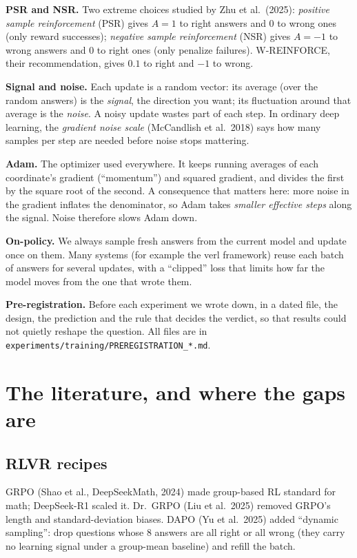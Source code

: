 \documentclass[11pt]{article}
\begin{document}
\textbf{PSR and NSR.} Two extreme choices studied by Zhu et al.\ (2025): \emph{positive sample reinforcement} (PSR) gives $A=1$ to right answers and $0$ to wrong ones (only reward successes); \emph{negative sample reinforcement} (NSR) gives $A=-1$ to wrong answers and $0$ to right ones (only penalize failures). W-REINFORCE, their recommendation, gives $0.1$ to right and $-1$ to wrong.

\textbf{Signal and noise.} Each update is a random vector: its average (over the random answers) is the \emph{signal}, the direction you want; its fluctuation around that average is the \emph{noise}. A noisy update wastes part of each step. In ordinary deep learning, the \emph{gradient noise scale} (McCandlish et al.\ 2018) says how many samples per step are needed before noise stops mattering.

\textbf{Adam.} The optimizer used everywhere. It keeps running averages of each coordinate's gradient (``momentum'') and squared gradient, and divides the first by the square root of the second. A consequence that matters here: more noise in the gradient inflates the denominator, so Adam takes \emph{smaller effective steps} along the signal. Noise therefore slows Adam down.

\textbf{On-policy.} We always sample fresh answers from the current model and update once on them. Many systems (for example the verl framework) reuse each batch of answers for several updates, with a ``clipped'' loss that limits how far the model moves from the one that wrote them.

\textbf{Pre-registration.} Before each experiment we wrote down, in a dated file, the design, the prediction and the rule that decides the verdict, so that results could not quietly reshape the question. All files are in \texttt{experiments/training/PREREGISTRATION\_*.md}.

\section{The literature, and where the gaps are}\label{sec:lit}

\subsection{RLVR recipes}
GRPO (Shao et al., DeepSeekMath, 2024) made group-based RL standard for math; DeepSeek-R1 scaled it. Dr.\ GRPO (Liu et al.\ 2025) removed GRPO's length and standard-deviation biases. DAPO (Yu et al.\ 2025) added ``dynamic sampling'': drop questions whose 8 answers are all right or all wrong (they carry no learning signal under a group-mean baseline) and refill the batch.
\end{document}

